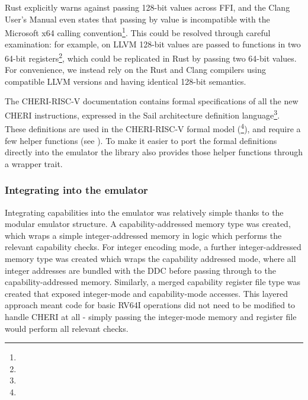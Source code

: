 Rust explicitly warns against passing 128-bit values across FFI, and the Clang User's Manual even states that passing  by value is incompatible with the Microsoft x64 calling convention\footnote{}.
This could be resolved through careful examination: for example, on LLVM 128-bit values are passed to functions in two 64-bit registers\footnote{}, which could be replicated in Rust by passing two 64-bit values.
For convenience, we instead rely on the Rust and Clang compilers using compatible LLVM versions and having identical 128-bit semantics.


The CHERI-RISC-V documentation contains formal specifications of all the new CHERI instructions, expressed in the Sail architecture definition  language\footnote{}.
These definitions are used in the CHERI-RISC-V formal model (\footnote{}), and require a few helper functions (see \cite[Chapter 8.2]{TR-951}).
To make it easier to port the formal definitions directly into the emulator the  library also provides those helper functions through a wrapper trait.


\subsubsection{Integrating into the emulator}
Integrating capabilities into the emulator was relatively simple thanks to the modular emulator structure.
A capability-addressed memory type was created, which wraps a simple integer-addressed memory in logic which performs the relevant capability checks.
For integer encoding mode, a further integer-addressed memory type was created which wraps the capability addressed mode, where all integer addresses are bundled with the DDC before passing through to the capability-addressed memory.
Similarly, a merged capability register file type was created that exposed integer-mode and capability-mode accesses.
This layered approach meant code for basic RV64I operations did not need to be modified to handle CHERI at all - simply passing the integer-mode memory and register file would perform all relevant checks.


